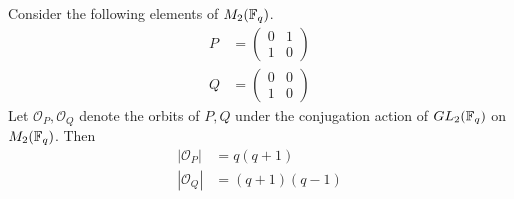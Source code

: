 \documentclass{amsart}
\begin{document}
\begin{lemma}\label{orbit-sizes}
    Consider the following elements of $M_2(\protect\mathbb{F}_q)$.
    \begin{align*}
        P &= 
        \begin{pmatrix}
            0 & 1 \\
            1 & 0
        \end{pmatrix} \\
        Q &=
        \begin{pmatrix}
            0 & 0 \\
            1 & 0
        \end{pmatrix}
    \end{align*}
    Let $\mathcal{O}_P, \mathcal{O}_Q$ denote the orbits of $P, Q$ under the conjugation action of $GL_2(\protect\mathbb{F}_q)$ on $M_2(\protect\mathbb{F}_q)$. Then
    \begin{align*}
        |\mathcal{O}_P| &= q(q + 1) \\
        |\mathcal{O}_Q| &= (q + 1)(q - 1)
    \end{align*}
\end{lemma}
\end{document}
